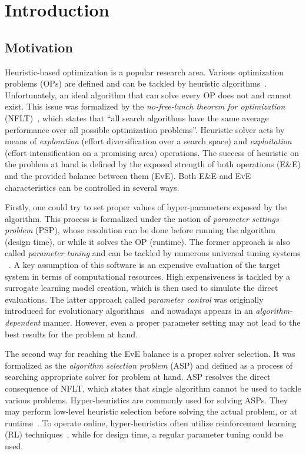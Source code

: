 \chapter{Introduction}\label{intro}

\section{Motivation}
Heuristic-based optimization is a popular research area. Various optimization problems (OPs) are defined and can be tackled by heuristic algorithms~\cite{junger2003combinatorial,biegler2004retrospective,festa2014brief}. Unfortunately, an ideal algorithm that can solve every OP does not and cannot exist. This issue was formalized by the \emph{no-free-lunch theorem for optimization} (NFLT)~\cite{wolpert1997no}, which states that ``all search algorithms have the same average performance over all possible optimization problems''. Heuristic solver acts by means of \emph{exploration} (effort diversification over a search space) and \emph{exploitation} (effort intensification on a promising area) operations. The success of heuristic on the problem at hand is defined by the exposed strength of both operations (E\&E) and the provided balance between them (EvE). Both E\&E and EvE characteristics can be controlled in several ways.

Firstly, one could try to set proper values of hyper-parameters exposed by the algorithm. This process is formalized under the notion of \emph{parameter settings problem} (PSP), whose resolution can be done before running the algorithm (design time), or while it solves the OP (runtime). The former approach is also called \emph{parameter tuning} and can be tackled by numerous universal tuning systems ~\cite{hutter2009paramils,hutter2011sequential,lopez2016irace,falkner2018bohb,brise2spl}. A key assumption of this software is an expensive evaluation of the target system in terms of computational resources. High expensiveness is tackled by a surrogate learning model creation, which is then used to simulate the direct evaluations. The latter approach called \emph{parameter control} was originally introduced for evolutionary algorithms~\cite{karafotias2014parameter} and nowadays appears in an \emph{algorithm-dependent} manner. However, even a proper parameter setting may not lead to the best results for the problem at hand. 

The second way for reaching the EvE balance is a proper solver selection. It was formalized as the \emph{algorithm selection problem} (ASP) and defined as a process of searching appropriate solver for problem at hand. ASP resolves the direct consequence of NFLT, which states that single algorithm cannot be used to tackle various problems. Hyper-heuristics are commonly used for solving ASPs. They may perform low-level heuristic selection before solving the actual problem, or at runtime~\cite{burke2019classification}. To operate online, hyper-heuristics often utilize reinforcement learning (RL) techniques~\cite{moriarty1999evolutionary,mcclymont2011markov}, while for design time, a regular parameter tuning could be used.

